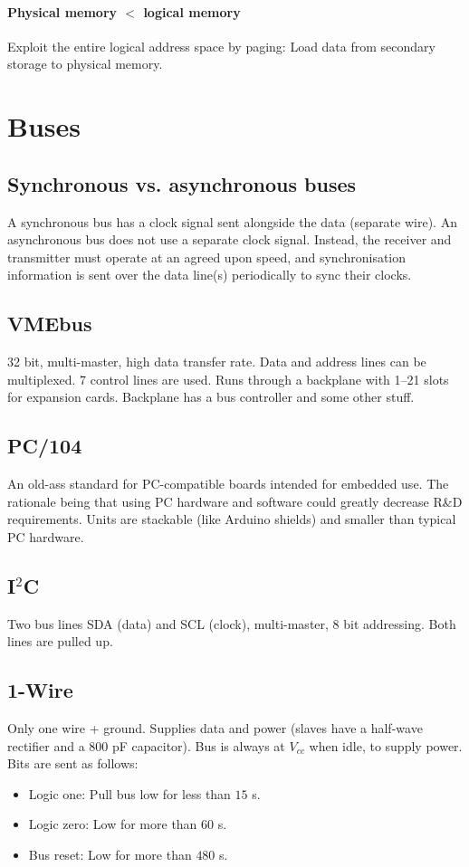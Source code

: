 \documentclass[a4paper, 12pt]{article}
\begin{document}
\paragraph{Physical memory $<$ logical memory} Exploit the entire logical address space by paging: Load data from secondary storage to physical memory.

\section{Buses}
\subsection{Synchronous vs. asynchronous buses}
A synchronous bus has a clock signal sent alongside the data (separate wire). An asynchronous bus does not use a separate clock signal. Instead, the receiver and transmitter must operate at an agreed upon speed, and synchronisation information is sent over the data line(s) periodically to sync their clocks.

\subsection{VMEbus}
32 bit, multi-master, high data transfer rate. Data and address lines can be multiplexed. 7 control lines are used. Runs through a backplane with 1--21 slots for expansion cards. Backplane has a bus controller and some other stuff.

\subsection{PC/104}
An old-ass standard for PC-compatible boards intended for embedded use. The rationale being that using PC hardware and software could greatly decrease R\&D requirements. Units are stackable (like Arduino shields) and smaller than typical PC hardware.

\subsection{I$^2$C}
Two bus lines SDA (data) and SCL (clock), multi-master, 8 bit addressing. Both lines are pulled up.

\subsection{1-Wire}
Only one wire + ground. Supplies data and power (slaves have a half-wave rectifier and a $800$ pF capacitor). Bus is always at $V_{cc}$ when idle, to supply power. Bits are sent as follows:
\begin{itemize}[noitemsep]
\item Logic one: Pull bus low for less than $15$  \textmu s.
\item Logic zero: Low for more than $60$ \textmu s.
\item Bus reset: Low for more than $480$ \textmu s.
\end{itemize}
\end{document}
